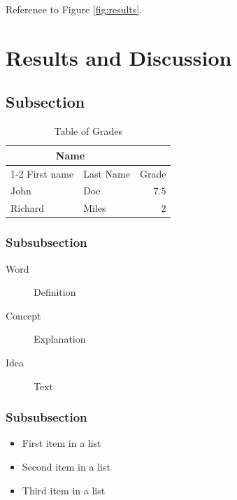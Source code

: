 \documentclass[fleqn,10pt]{JLA_article} %
\begin{document}
Reference to Figure \ref{fig:results}.


\section{Results and Discussion}

\lipsum[10] %

\subsection{Subsection}

\lipsum[11] %

\begin{table}[hbt]
\caption{Table of Grades}
\centering
\begin{tabular}{llr}
\toprule
\multicolumn{2}{c}{Name} \\
\cmidrule(r){1-2}
First name & Last Name & Grade \\
\midrule
John & Doe & $7.5$ \\
Richard & Miles & $2$ \\
\bottomrule
\end{tabular}
\label{tab:label}
\end{table}

\subsubsection{Subsubsection}

\lipsum[12] %

\begin{description}
\item[Word] Definition
\item[Concept] Explanation
\item[Idea] Text
\end{description}

\subsubsection{Subsubsection}

\lipsum[13] %

\begin{itemize}[noitemsep] %
\item First item in a list
\item Second item in a list
\item Third item in a list
\end{itemize}
\end{document}

